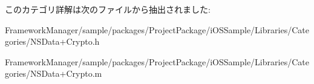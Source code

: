 このカテゴリ詳解は次のファイルから抽出されました\+:\begin{DoxyCompactItemize}
\item 
Framework\+Manager/sample/packages/\+Project\+Package/i\+O\+S\+Sample/\+Libraries/\+Categories/N\+S\+Data+\+Crypto.\+h\item 
Framework\+Manager/sample/packages/\+Project\+Package/i\+O\+S\+Sample/\+Libraries/\+Categories/N\+S\+Data+\+Crypto.\+m\end{DoxyCompactItemize}
